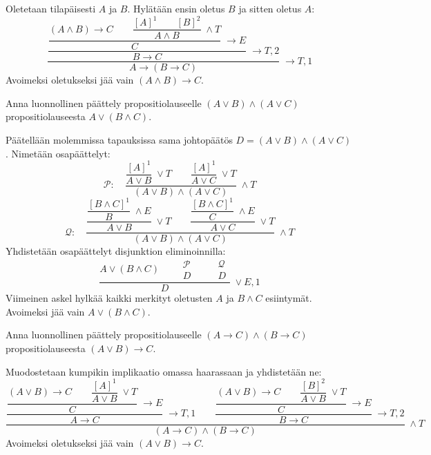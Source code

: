 \documentclass[11pt,a4paper]{amsart}
\begin{document}
\begin{solution}
Oletetaan tilapäisesti \(A\) ja \(B\). Hylätään ensin oletus \(B\)
ja sitten oletus \(A\):
\[
\dfrac{
\dfrac{
\dfrac{
(A\land B)\to C
\qquad
\dfrac{[A]^1\qquad[B]^2}{A\land B}\;\land T
}{C}\;\to E
}{B\to C}\;\to T,2
}{A\to(B\to C)}\;\to T,1
\]
Avoimeksi oletukseksi jää vain \((A\land B)\to C\).
\end{solution}

\newpage

\begin{exercise}
Anna luonnollinen päättely propositiolauseelle
\((A \lor B) \land (A \lor C)\) propositiolauseesta \(A \lor (B \land C)\).
\end{exercise}

\begin{solution}
Päätellään molemmissa tapauksissa sama johtopäätös
\(D=(A\lor B)\land(A\lor C)\). Nimetään osapäättelyt:
\[
\mathcal{P}:\quad
\dfrac{
\dfrac{[A]^1}{A\lor B}\;\lor T
\qquad
\dfrac{[A]^1}{A\lor C}\;\lor T
}{(A\lor B)\land(A\lor C)}\;\land T
\]
\[
\mathcal{Q}:\quad
\dfrac{
\dfrac{\dfrac{[B\land C]^1}{B}\;\land E}{A\lor B}\;\lor T
\qquad
\dfrac{\dfrac{[B\land C]^1}{C}\;\land E}{A\lor C}\;\lor T
}{(A\lor B)\land(A\lor C)}\;\land T
\]
Yhdistetään osapäättelyt disjunktion eliminoinnilla:
\[
\dfrac{
A\lor(B\land C)
\qquad
\begin{array}{c}\mathcal{P}\\D
\end{array}
\qquad
\begin{array}{c}\mathcal{Q}\\D
\end{array}
}{D}\;\lor E,1
\]
Viimeinen askel hylkää kaikki merkityt oletusten \(A\) ja
\(B\land C\) esiintymät. Avoimeksi jää vain \(A\lor(B\land C)\).
\end{solution}

\begin{exercise}
Anna luonnollinen päättely propositiolauseelle
\((A \rightarrow C) \land (B \rightarrow C)\)
propositiolauseesta \((A \lor B) \rightarrow C\).
\end{exercise}

\begin{solution}
Muodostetaan kumpikin implikaatio omassa haarassaan ja yhdistetään ne:
{\small
\[
\dfrac{
\dfrac{
\dfrac{
  (A\lor B)\to C
  \qquad\dfrac{[A]^1}{A\lor B}\;\lor T
}{C}\;\to E
}{A\to C}\;\to T,1
\qquad
\dfrac{
\dfrac{
  (A\lor B)\to C
  \qquad\dfrac{[B]^2}{A\lor B}\;\lor T
}{C}\;\to E
}{B\to C}\;\to T,2
}{(A\to C)\land(B\to C)}\;\land T
\]
}
Avoimeksi oletukseksi jää vain \((A\lor B)\to C\).
\end{solution}
\end{document}
